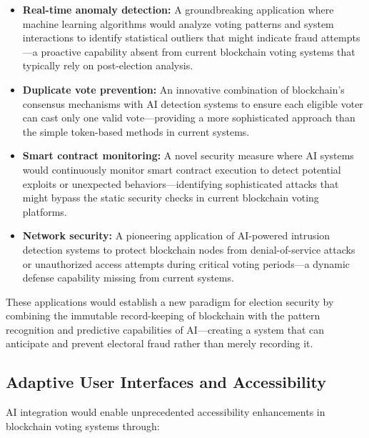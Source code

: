 \documentclass[conference]{IEEEtran}
\begin{document}
\begin{itemize}
    \item \textbf{Real-time anomaly detection:} A groundbreaking application where machine learning algorithms would analyze voting patterns and system interactions to identify statistical outliers that might indicate fraud attempts—a proactive capability absent from current blockchain voting systems that typically rely on post-election analysis.
    
    \item \textbf{Duplicate vote prevention:} An innovative combination of blockchain's consensus mechanisms with AI detection systems to ensure each eligible voter can cast only one valid vote—providing a more sophisticated approach than the simple token-based methods in current systems.
    
    \item \textbf{Smart contract monitoring:} A novel security measure where AI systems would continuously monitor smart contract execution to detect potential exploits or unexpected behaviors—identifying sophisticated attacks that might bypass the static security checks in current blockchain voting platforms.
    
    \item \textbf{Network security:} A pioneering application of AI-powered intrusion detection systems to protect blockchain nodes from denial-of-service attacks or unauthorized access attempts during critical voting periods—a dynamic defense capability missing from current systems.
\end{itemize}

These applications would establish a new paradigm for election security by combining the immutable record-keeping of blockchain with the pattern recognition and predictive capabilities of AI—creating a system that can anticipate and prevent electoral fraud rather than merely recording it.

\subsection{Adaptive User Interfaces and Accessibility}
AI integration would enable unprecedented accessibility enhancements in blockchain voting systems through:
\end{document}
